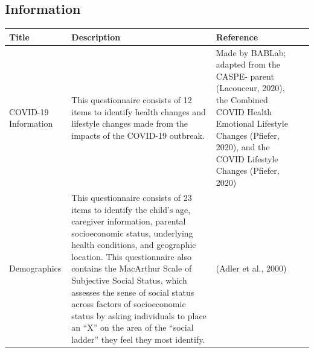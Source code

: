 \documentclass[]{book}
\begin{document}
\hypertarget{information}{%
\subsection{Information}\label{information}}

\begin{longtable}[]{@{}llll@{}}
\toprule
\begin{minipage}[b]{0.22\columnwidth}\raggedright
Title\strut
\end{minipage} & \begin{minipage}[b]{0.27\columnwidth}\raggedright
Description\strut
\end{minipage} & \begin{minipage}[b]{0.22\columnwidth}\raggedright
Reference\strut
\end{minipage} & \begin{minipage}[b]{0.18\columnwidth}\raggedright
\strut
\end{minipage}\tabularnewline
\midrule
\endhead
\begin{minipage}[t]{0.22\columnwidth}\raggedright
COVID-19 Information\strut
\end{minipage} & \begin{minipage}[t]{0.27\columnwidth}\raggedright
This questionnaire consists of 12 items to identify health changes and lifestyle changes made from the impacts of the COVID-19 outbreak.\strut
\end{minipage} & \begin{minipage}[t]{0.22\columnwidth}\raggedright
Made by BABLab; adapted from the CASPE- parent (Lacouceur, 2020), the Combined COVID Health Emotional Lifestyle Changes (Pfiefer, 2020), and the COVID Lifestyle Changes (Pfiefer, 2020)\strut
\end{minipage} & \begin{minipage}[t]{0.18\columnwidth}\raggedright
\strut
\end{minipage}\tabularnewline
\begin{minipage}[t]{0.22\columnwidth}\raggedright
Demographics\strut
\end{minipage} & \begin{minipage}[t]{0.27\columnwidth}\raggedright
This questionnaire consists of 23 items to identify the child's age, caregiver information, parental socioeconomic status, underlying health conditions, and geographic location. This questionnaire also contains the MacArthur Scale of Subjective Social Status, which assesses the sense of social status across factors of socioeconomic status by asking individuals to place an ``X'' on the area of the ``social ladder'' they feel they most identify.\strut
\end{minipage} & \begin{minipage}[t]{0.22\columnwidth}\raggedright
(Adler et al., 2000)\strut
\end{minipage} & \begin{minipage}[t]{0.18\columnwidth}\raggedright
\strut
\end{minipage}\tabularnewline
\bottomrule
\end{longtable}
\end{document}
